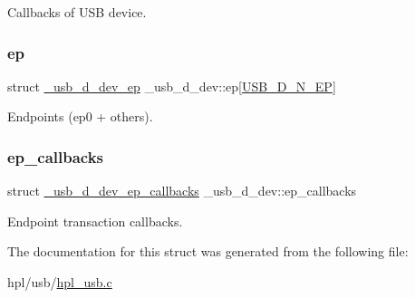 Callbacks of U\+SB device. \mbox{\label{struct__usb__d__dev_ab05786383c855842843a28f548b052ac}} 
\subsubsection{\texorpdfstring{ep}{ep}}
{\footnotesize\ttfamily struct \hyperlink{struct__usb__d__dev__ep}{\+\_\+usb\+\_\+d\+\_\+dev\+\_\+ep} \+\_\+usb\+\_\+d\+\_\+dev\+::ep\mbox{[}\hyperlink{hpl__usb_8c_a12a5580ba5a2ca674cb271474ae5e819}{U\+S\+B\+\_\+\+D\+\_\+\+N\+\_\+\+EP}\mbox{]}}

Endpoints (ep0 + others). \mbox{\label{struct__usb__d__dev_ade523e67004729ba637734e248ba0c5d}} 
\subsubsection{\texorpdfstring{ep\+\_\+callbacks}{ep\_callbacks}}
{\footnotesize\ttfamily struct \hyperlink{struct__usb__d__dev__ep__callbacks}{\+\_\+usb\+\_\+d\+\_\+dev\+\_\+ep\+\_\+callbacks} \+\_\+usb\+\_\+d\+\_\+dev\+::ep\+\_\+callbacks}

Endpoint transaction callbacks. 

The documentation for this struct was generated from the following file\+:\begin{DoxyCompactItemize}
\item 
hpl/usb/\hyperlink{hpl__usb_8c}{hpl\+\_\+usb.\+c}\end{DoxyCompactItemize}
